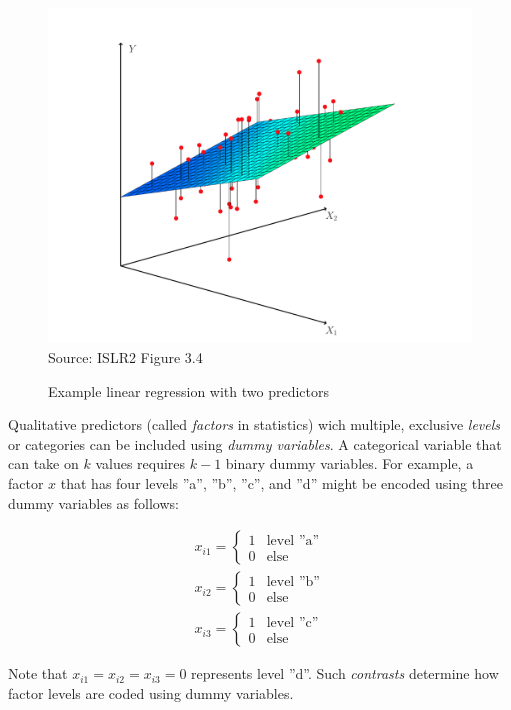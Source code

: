 \begin{figure}
\centering
\includegraphics[width=.66\textwidth]{../class11/Figures_Chapters_1-6/Chapter3/3_4.pdf}  \\

\scriptsize Source: ISLR2 Figure 3.4
\caption{Example linear regression with two predictors}
\label{fig:plane}
\end{figure}

Qualitative predictors (called \emph{factors} in statistics) wich multiple, exclusive \emph{levels} or categories can be included using \emph{dummy variables}. A categorical variable that can take on $k$ values requires $k-1$ binary dummy variables. For example, a factor $x$ that has four levels ''a'', ''b'', ''c'', and ''d'' might be encoded using three dummy variables as follows:

\begin{align*}
x_{i1} = \begin{cases}
1 & \text{level ''a''} \\
0 & \text{else}
\end{cases} \\
x_{i2} = \begin{cases}
1 & \text{level ''b''} \\
0 & \text{else}
\end{cases} \\
x_{i3} = \begin{cases}
1 & \text{level ''c''} \\
0 & \text{else}
\end{cases}
\end{align*}

\noindent Note that $x_{i1} = x_{i2} = x_{i3} = 0$ represents level ''d''. Such \emph{contrasts} determine how factor levels are coded using dummy variables.


